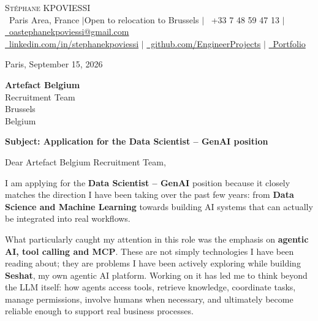 \documentclass[letterpaper,11pt]{article}
\begin{document}
\begin{center}
    {\Huge \scshape \color{primary} Stéphane KPOVIESSI} \\ \vspace{4pt}
    \small
    {\color{primary}\faMapMarker}~Paris Area, France \enspace$|$\enspace Open to relocation to Brussels \enspace$|$\enspace
    {\color{primary}\faPhone}~+33 7 48 59 47 13 \enspace$|$\enspace
    \href{mailto:oastephanekpoviessi@gmail.com}{\faEnvelope~oastephanekpoviessi@gmail.com} \\ \vspace{3pt}
    \href{https://linkedin.com/in/stephanekpoviessi}{\faLinkedin~linkedin.com/in/stephanekpoviessi} \enspace$|$\enspace
    \href{https://github.com/EngineerProjects}{\faGithub~github.com/EngineerProjects} \enspace$|$\enspace
    \href{https://kpoviessi-stephane.vercel.app/}{\faUser~Portfolio}
\end{center}

\vspace{0.2cm}

\begin{flushright}
Paris, September 15, 2026

\vspace{0.25cm}
\textbf{Artefact Belgium} \\
Recruitment Team \\
Brussels \\
Belgium
\end{flushright}

\vspace{0.3cm}

\textbf{Subject: Application for the Data Scientist -- GenAI position}

\vspace{0.4cm}

Dear Artefact Belgium Recruitment Team,

I am applying for the \textbf{Data Scientist -- GenAI} position because it closely matches the direction I have been taking over the past few years: from \textbf{Data Science and Machine Learning} towards building AI systems that can actually be integrated into real workflows.

What particularly caught my attention in this role was the emphasis on \textbf{agentic AI, tool calling and MCP}. These are not simply technologies I have been reading about; they are problems I have been actively exploring while building \textbf{Seshat}, my own agentic AI platform. Working on it has led me to think beyond the LLM itself: how agents access tools, retrieve knowledge, coordinate tasks, manage permissions, involve humans when necessary, and ultimately become reliable enough to support real business processes.
\end{document}
